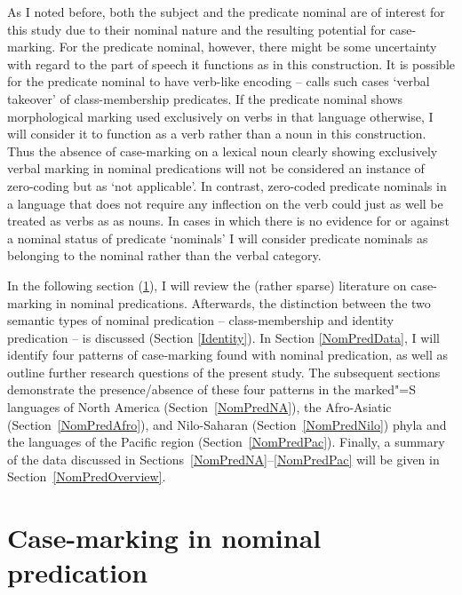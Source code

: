 As I noted before, both the subject and the predicate nominal are of interest for this study due to their nominal nature and the resulting potential for case-marking. 
For the predicate nominal, however, there might be some uncertainty with regard to the part of speech it functions as in this construction. 
It is possible for the predicate nominal to have verb-like encoding -- \citet{Stassen:1997} calls such cases `verbal takeover' of class-membership predicates. 
If the predicate nominal shows morphological marking used exclusively on verbs in that language otherwise, I will consider it to function as a verb rather than a noun in this construction. 
Thus the absence of case-marking on a lexical noun clearly showing exclusively verbal marking in nominal predications will not be considered an instance of zero-coding but as `not applicable'. 
In contrast, zero-coded predicate nominals in a language that does not require any inflection on the verb could just as well be treated as verbs as as nouns. 
In cases in which there is no evidence for or against a nominal status of predicate `nominals' I will consider predicate nominals as  belonging to the nominal rather than the verbal category. 

In the following section (\ref{CaseNomPred}), I will review the (rather sparse) literature on case-marking in nominal predications.
Afterwards, the distinction between the two semantic types of nominal predication -- class-membership and identity predication -- is discussed (Section \ref{Identity}). 
In Section \ref{NomPredData}, I will identify four patterns of case-marking found with nominal predication, as well as outline further research questions of the present study. 
The subsequent sections demonstrate the presence/absence of these four patterns in the marked"=S languages of North America (Section~\ref{NomPredNA}), the Afro-Asiatic (Section~\ref{NomPredAfro}), and Nilo-Saharan (Section~\ref{NomPredNilo}) phyla and the languages of the Pacific region (Section~\ref{NomPredPac}). 
Finally, a summary of the data discussed in Sections~\ref{NomPredNA}--\ref{NomPredPac} will be given in Section~\ref{NomPredOverview}. 


\section{Case-marking in nominal predication}\label{CaseNomPred}

